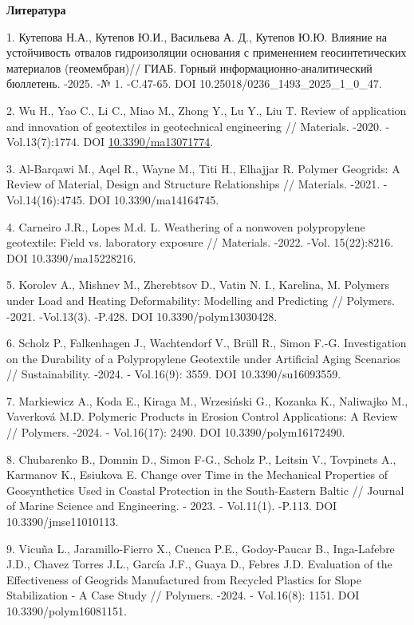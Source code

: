 \begin{center}
{\bfseries Литература}
\end{center}

\begin{refs}
1. Кутепова Н.А., Кутепов Ю.И., Васильева А. Д., Кутепов Ю.Ю. Влияние на
устойчивость отвалов гидроизоляции основания с применением
геосинтетических материалов (геомембран)// ГИАБ. Горный
информационно-аналитический бюллетень. -2025. -№ 1. -C.47-65. DOI
10.25018/0236\_1493\_2025\_1\_0\_47.

2. Wu H., Yao C., Li C., Miao M., Zhong Y., Lu Y., Liu T. Review of
application and innovation of geotextiles in geotechnical engineering //
Materials. -2020. -Vol.13(7):1774. DOI
\href{https://doi.org/10.3390/ma13071774}{10.3390/ma13071774}.

3. Al-Barqawi M., Aqel R., Wayne M., Titi H., Elhajjar R. Polymer
Geogrids: A Review of Material, Design and Structure Relationships //
Materials. -2021. -Vol.14(16):4745. DOI 10.3390/ma14164745.

4. Carneiro J.R., Lopes M.d. L. Weathering of a nonwoven polypropylene
geotextile: Field vs. laboratory exposure // Materials. -2022. -Vol.
15(22):8216. DOI 10.3390/ma15228216.

5. Korolev A., Mishnev M., Zherebtsov D., Vatin N. I., Karelina, M.
Polymers under Load and Heating Deformability: Modelling and Predicting
// Polymers. -2021. -Vol.13(3). -P.428. DOI 10.3390/polym13030428.

6. Scholz P., Falkenhagen J., Wachtendorf V., Brüll R., Simon F.-G.
Investigation on the Durability of a Polypropylene Geotextile under
Artificial Aging Scenarios // Sustainability. -2024. - Vol.16(9): 3559.
DOI 10.3390/su16093559.

7. Markiewicz A., Koda E., Kiraga M., Wrzesiński G., Kozanka K.,
Naliwajko M., Vaverková M.D. Polymeric Products in Erosion Control
Applications: A Review // Polymers. -2024. - Vol.16(17): 2490. DOI
10.3390/polym16172490.

8. Chubarenko B., Domnin D., Simon F-G., Scholz P., Leitsin V., Tovpinets
A., Karmanov K., Esiukova E. Change over Time in the Mechanical
Properties of Geosynthetics Used in Coastal Protection in the
South-Eastern Baltic // Journal of Marine Science and Engineering. -
2023. - Vol.11(1). -P.113. DOI 10.3390/jmse11010113.

9. Vicuña L., Jaramillo-Fierro X., Cuenca P.E., Godoy-Paucar B.,
Inga-Lafebre J.D., Chavez Torres J.L., García J.F., Guaya D., Febres
J.D. Evaluation of the Effectiveness of Geogrids Manufactured from
Recycled Plastics for Slope Stabilization - A Case Study // Polymers.
-2024. - Vol.16(8): 1151. DOI 10.3390/polym16081151.


\end{refs}
